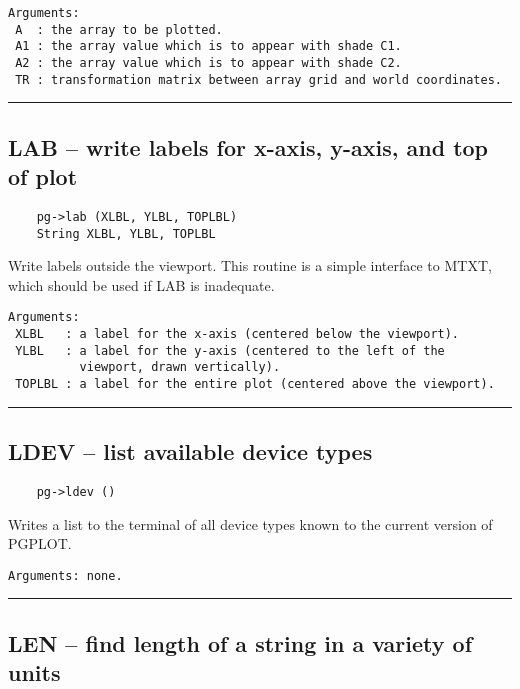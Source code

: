 \begin{verbatim}
Arguments:
 A  : the array to be plotted.
 A1 : the array value which is to appear with shade C1.
 A2 : the array value which is to appear with shade C2.
 TR : transformation matrix between array grid and world coordinates. 
\end{verbatim}

\hrule

\subsection*{LAB -- write labels for x-axis, y-axis, and top of plot }

\begin{verbatim}
    pg->lab (XLBL, YLBL, TOPLBL)
    String XLBL, YLBL, TOPLBL
\end{verbatim}

Write labels outside the viewport.  This routine is a simple interface
to MTXT, which should be used if LAB is inadequate.

\begin{verbatim}
Arguments:
 XLBL   : a label for the x-axis (centered below the viewport). 
 YLBL   : a label for the y-axis (centered to the left of the
          viewport, drawn vertically). 
 TOPLBL : a label for the entire plot (centered above the viewport). 
\end{verbatim}

\hrule

\subsection*{LDEV -- list available device types }

\begin{verbatim}
    pg->ldev ()
\end{verbatim}

Writes a list to the terminal of all device types known to the current
version of PGPLOT.

\begin{verbatim}
Arguments: none.
\end{verbatim}

\hrule

\subsection*{LEN -- find length of a string in a variety of units }

